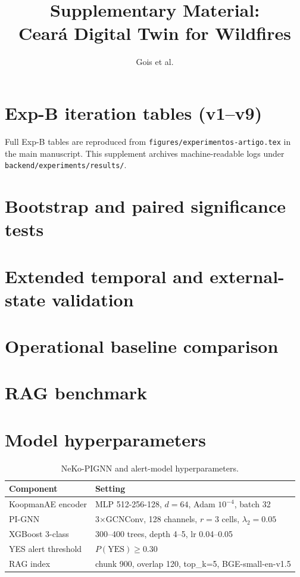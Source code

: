 \documentclass[11pt,a4paper]{article}
\title{Supplementary Material:\\Ceará Digital Twin for Wildfires}
\author{Gois et al.}
\date{}
\begin{document}
\maketitle

\section{Exp-B iteration tables (v1--v9)}
Full Exp-B tables are reproduced from \texttt{figures/experimentos-artigo.tex} in the main manuscript. This supplement archives machine-readable logs under \texttt{backend/experiments/results/}.

\section{Bootstrap and paired significance tests}



\section{Extended temporal and external-state validation}



\section{Operational baseline comparison}


\section{RAG benchmark}


\section{Model hyperparameters}
\begin{table}[htbp]
\centering
\caption{NeKo-PIGNN and alert-model hyperparameters.}
\small
\begin{tabular}{@{}ll@{}}
\toprule
\textbf{Component} & \textbf{Setting} \\
\midrule
KoopmanAE encoder & MLP 512-256-128, $d=64$, Adam $10^{-4}$, batch 32 \\
PI-GNN & 3$\times$GCNConv, 128 channels, $r=3$ cells, $\lambda_2=0.05$ \\
XGBoost 3-class & 300--400 trees, depth 4--5, lr 0.04--0.05 \\
YES alert threshold & $P(\text{YES}) \geq 0.30$ \\
RAG index & chunk 900, overlap 120, top\_k=5, BGE-small-en-v1.5 \\
\bottomrule
\end{tabular}
\end{table}
\end{document}
